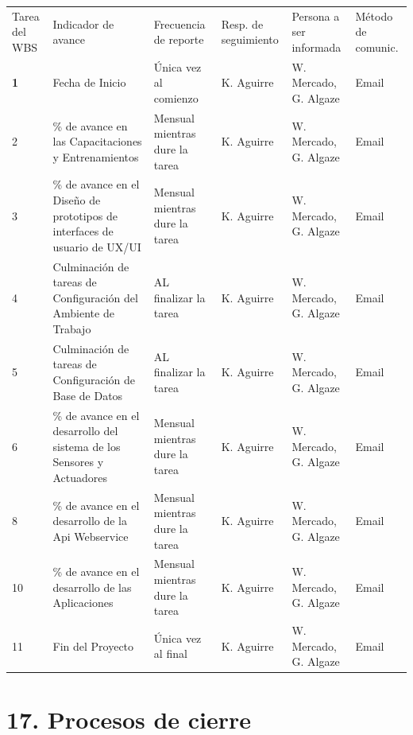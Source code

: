 \documentclass[11pt]{charter}
\begin{document}
\begin{landscape}
\begin{tabularx}{\linewidth}{@{}|X|C{8cm}|C{4cm}|C{2cm}|C{4cm}|C{2cm}|@{}}
\hline
{} 
                                                                       \\ \hline
{} 
Tarea del WBS & Indicador de avance & Frecuencia de reporte & Resp. de seguimiento & Persona a ser informada & Método de comunic. \\ \hline
\textbf{1} & Fecha de Inicio & Única vez al comienzo & K. Aguirre & W. Mercado, G. Algaze & Email \\
2 & \% de avance en las   Capacitaciones y Entrenamientos & Mensual mientras dure la tarea & K. Aguirre & W. Mercado, G. Algaze & Email \\
3 & \% de avance en  el Diseño de prototipos de interfaces de   usuario de UX/UI & Mensual mientras dure la tarea & K. Aguirre & W. Mercado, G. Algaze & Email \\
4 & Culminación de tareas de   Configuración del Ambiente de Trabajo & AL finalizar la tarea & K. Aguirre & W. Mercado, G. Algaze & Email \\
5 & Culminación de tareas de   Configuración de Base de Datos & AL finalizar la tarea & K. Aguirre & W. Mercado, G. Algaze & Email \\
6 & \% de avance en el desarrollo   del sistema de los Sensores y Actuadores & Mensual mientras dure la tarea & K. Aguirre & W. Mercado, G. Algaze & Email \\
8 & \% de avance en el desarrollo   de la Api Webservice & Mensual mientras dure la tarea & K. Aguirre & W. Mercado, G. Algaze & Email \\
10 & \% de avance en el desarrollo   de las Aplicaciones & Mensual mientras dure la tarea & K. Aguirre & W. Mercado, G. Algaze & Email \\
11 & Fin del Proyecto & Única vez al final & K. Aguirre & W. Mercado, G. Algaze & Email
\end{tabularx}%
\end{landscape}

\section{17. Procesos de cierre}    
\label{sec:cierre}
\end{document}
